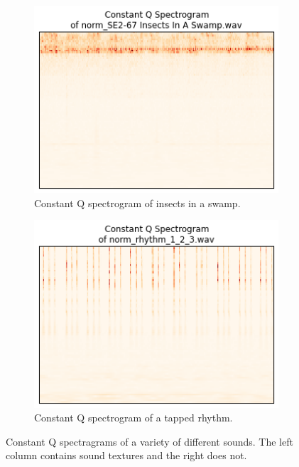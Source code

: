 \documentclass{sig-alternate-05-2015}
\begin{document}
\begin{figure}[hbt!]
\begin{subfigure}[b]{0.45\textwidth}
      \centering
      \includegraphics[width=\textwidth]{figures/cqt_insects.png}
      \caption{Constant Q spectrogram of insects in a swamp.}
      \label{fig:cqt-applause}
    \end{subfigure}
    \hfill 
    \begin{subfigure}[b]{0.45\textwidth}
      \centering
      \includegraphics[width=\textwidth]{figures/cqt_rythm123.png}
      \caption{Constant Q spectrogram of a tapped rhythm.}
      \label{fig:cqt-applause}
    \end{subfigure}
    \caption{Constant Q spectragrams of a variety of different sounds. The left column contains sound textures and the right does not.}
    \label{fig:spectrograms}
  \end{figure}
\end{document}

